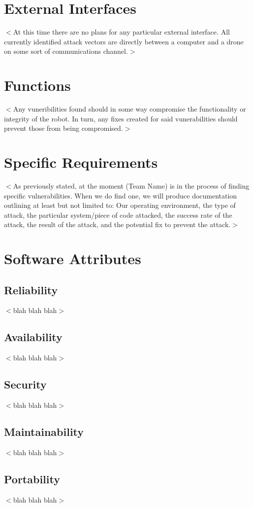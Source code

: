 \documentclass{scrreprt}
\begin{document}
\section{External Interfaces}
$<$At this time there are no plans for any particular external interface. All currently identified attack vectors are directly between
a computer and a drone on some sort of communications channel.$>$

\section{Functions}
$<$Any vuneribilities found should in some way compromise the functionality or integrity of the robot. In turn, any fixes created for said vunerabilities
should prevent those from being compromised.$>$

\section{Specific Requirements}
$<$As previously stated, at the moment (Team Name) is in the process of finding specific vulnerabilities. When we do find one, we will produce documentation outlining at least but not limited to:
Our operating environment, the type of attack, the particular system/piece of code attacked, the success rate of the attack, the result of the attack, and the potential fix to prevent the attack.$>$

\section{Software Attributes}
  \subsection{Reliability}
  $<$blah blah blah$>$

  \subsection{Availability}
  $<$blah blah blah$>$

  \subsection{Security}
  $<$blah blah blah$>$

  \subsection{Maintainability}
  $<$blah blah blah$>$

  \subsection{Portability}
  $<$blah blah blah$>$
\end{document}
